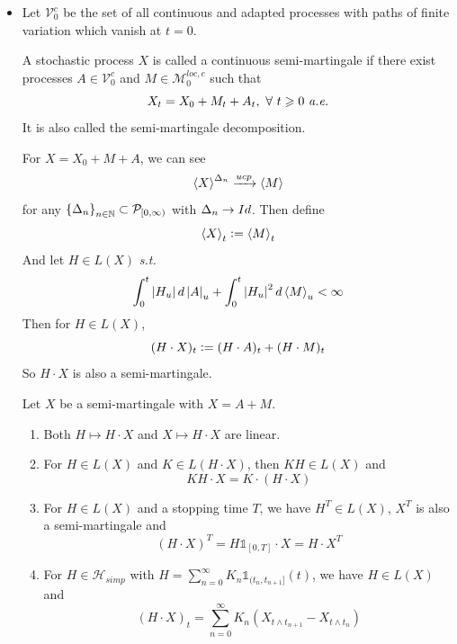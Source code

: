 \documentclass[a4paper,12pt]{article}
\begin{document}
\begin{itemize}
  \item Let $\mathcal{V}_0^c$ be the set of all continuous and adapted processes with paths of finite variation which vanish at $t=0$. 

  \noindent A stochastic process $X$ is called a continuous semi-martingale if there exist processes $A \in \mathcal{V}_0^c$ and $M \in \mathcal{M}_0^{loc,c}$ such that
  \begin{equation*}
    X_t = X_0 + M_t + A_t,~\forall~t \geqslant 0~\emph{a.e.}
  \end{equation*}
  It is also called the semi-martingale decomposition.

  \noindent For $X =X_0 + M + A$, we can see
  \begin{equation*}
    \left\langle X \right\rangle^{\Delta_n} \xrightarrow{ucp} \left\langle M \right\rangle
  \end{equation*}
  for any $\left\{\Delta_n\right\}_{n \in \mathbb{N}} \subset \mathcal{P}_{[0,\infty)}$ with $\Delta_n\rightarrow Id$. Then define
  \begin{equation*}
    \left\langle X \right\rangle_t \vcentcolon= \left\langle M \right\rangle_t
  \end{equation*}
  And let $H \in L(X)$ \emph{s.t.}
  \begin{equation*}
    \int_0^t\left\lvert H_u\right\lvert d\left\lvert A\right\lvert_u + \int_0^t\left\lvert H_u\right\lvert^2d\left\langle M \right\rangle_u < \infty
  \end{equation*}
  Then for $H \in L(X)$,
  \begin{equation*}
    (H \cdot X)_t \vcentcolon= (H \cdot A)_t + (H \cdot M)_t
  \end{equation*}
  So $H\cdot X$ is also a semi-martingale.
  \begin{prop}
    Let $X$ be a semi-martingale with $X = A + M$.
    \begin{enumerate}[label=(\arabic*)]
      \item Both $H \mapsto H\cdot X$ and $X \mapsto H \cdot X$ are linear.
      \item For $H \in L(X)$ and $K \in L(H \cdot X)$, then $KH \in L(X)$ and
      \begin{equation*}
        KH \cdot X = K \cdot (H \cdot X)
      \end{equation*}
      \item For $H \in L(X)$ and a stopping time $T$, we have $H^T \in L(X)$, $X^T$ is also a semi-martingale and
      \begin{equation*}
        (H\cdot X)^T = H\mathds{1}_{[0,T]} \cdot X = H \cdot X^T
      \end{equation*}
      \item For $H \in \mathcal{H}_{simp}$ with $H = \sum_{n=0}^{\infty} K_n\mathds{1}_{(t_n,t_{n+1}]}(t)$, we have $H \in L(X)$ and
      \begin{equation*}
        (H \cdot X)_t = \sum_{n=0}^{\infty} K_n(X_{t \wedge t_{n+1}} - X_{t \wedge t_{n}})
      \end{equation*}
    \end{enumerate}
  \end{prop}


\end{itemize}
\end{document}
